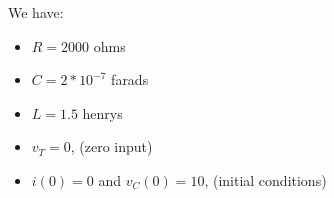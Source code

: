 \documentclass[preview]{standalone}
\begin{document}
\begin{center}
\raggedright
                We have: 
                \begin{itemize}
                  \item $R = 2000$ ohms
                  \item $C = 2 * 10^{-7}$  farads
                  \item $L = 1.5$ henrys
                  \item $v_T = 0$, (zero input)
                  \item $i(0) = 0$ and $v_C(0) = 10$, (initial conditions)
                \end{itemize}
\end{center}
\end{document}
